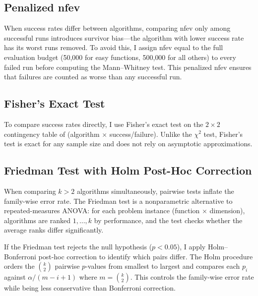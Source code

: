 \documentclass[11pt,a4paper]{article}
\begin{document}
\subsection{Penalized nfev}

When success rates differ between algorithms, comparing nfev only among successful runs introduces survivor bias---the algorithm with lower success rate has its worst runs removed. To avoid this, I assign nfev equal to the full evaluation budget (50{,}000 for easy functions, 500{,}000 for all others) to every failed run before computing the Mann--Whitney test. This penalized nfev ensures that failures are counted as worse than any successful run.

\subsection{Fisher's Exact Test}

To compare success rates directly, I use Fisher's exact test on the $2 \times 2$ contingency table of (algorithm $\times$ success/failure). Unlike the $\chi^2$ test, Fisher's test is exact for any sample size and does not rely on asymptotic approximations.

\subsection{Friedman Test with Holm Post-Hoc Correction}

When comparing $k > 2$ algorithms simultaneously, pairwise tests inflate the family-wise error rate. The Friedman test is a nonparametric alternative to repeated-measures ANOVA: for each problem instance (function $\times$ dimension), algorithms are ranked $1, \ldots, k$ by performance, and the test checks whether the average ranks differ significantly.

If the Friedman test rejects the null hypothesis ($p < 0.05$), I apply Holm--Bonferroni post-hoc correction to identify which pairs differ. The Holm procedure orders the $\binom{k}{2}$ pairwise $p$-values from smallest to largest and compares each $p_i$ against $\alpha / (m - i + 1)$ where $m = \binom{k}{2}$. This controls the family-wise error rate while being less conservative than Bonferroni correction.
\end{document}
